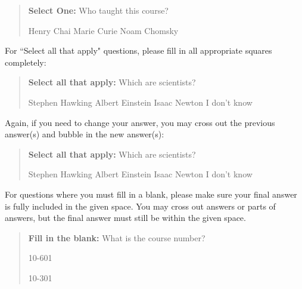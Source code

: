 \documentclass[11pt,addpoints,answers]{exam}
\newcommand{\blackcircle}{\tikz\draw[black,fill=black] (0,0) circle (1ex);}
\begin{document}
\begin{quote}
\textbf{Select One:} Who taught this course?
    {
    \begin{checkboxes}
     \CorrectChoice Henry Chai
     \choice Marie Curie \checkboxchar{\xcancel{\blackcircle}{}}
     \choice Noam Chomsky
    \end{checkboxes}
    }
\end{quote}

For ``Select all that apply" questions, please fill in all appropriate squares completely:

\begin{quote}
\textbf{Select all that apply:} Which are scientists?
    {%
    \checkboxchar{$\Box$} \checkedchar{$\blacksquare$} %
    \begin{checkboxes}
    \CorrectChoice Stephen Hawking 
    \CorrectChoice Albert Einstein
    \CorrectChoice Isaac Newton
    \choice I don't know
    \end{checkboxes}
    }
\end{quote}

Again, if you need to change your answer, you may cross out the previous answer(s) and bubble in the new answer(s):

\begin{quote}
\textbf{Select all that apply:} Which are scientists?
    {%
    \checkboxchar{\xcancel{$\blacksquare$}} \checkedchar{$\blacksquare$} %
    \begin{checkboxes}
    \CorrectChoice Stephen Hawking 
    \CorrectChoice Albert Einstein
    \CorrectChoice Isaac Newton
    \choice I don't know
    \end{checkboxes}
    }
\end{quote}

For questions where you must fill in a blank, please make sure your final answer is fully included in the given space. You may cross out answers or parts of answers, but the final answer must still be within the given space.

\begin{quote}
\textbf{Fill in the blank:} What is the course number?

\begin{tcolorbox}[fit,height=1cm, width=4cm, blank, borderline={1pt}{-2pt},nobeforeafter]
    \begin{center}\huge10-601\end{center}
    \end{tcolorbox}\hspace{2cm}
    \begin{tcolorbox}[fit,height=1cm, width=4cm, blank, borderline={1pt}{-2pt},nobeforeafter]
    \begin{center}\huge10-301\end{center}
    \end{tcolorbox}
\end{quote}
\end{document}
